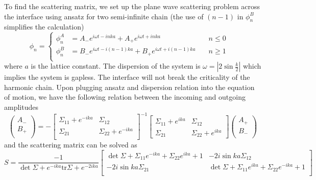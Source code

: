 To find the scattering matrix, we set up the plane wave scattering problem across the interface using ansatz for two semi-infinite chain (the use of $(n-1)$ in $\phi_n^B$ simplifies the calculation)
\begin{equation}
\label{eq:ansatz}
\phi_n
= \left\lbrace
  \begin{aligned}
    \phi_n^A &= A_{-} e^{i \omega t  - inka}  + A_{+} e^{i \omega t  + inka}  & \quad  n \le 0 \\
    \phi_n^B &= B_{-} e^{i \omega t  - i(n-1)ka}  + B_{+} e^{i \omega t  + i(n-1)ka} & \quad n \ge 1 \\
  \end{aligned} \right. 
 \quad 
\end{equation}
where $a$ is the lattice constant. The dispersion of the system is $\omega = \left|2\sin\frac{k}{2}\right|$ which implies the system is gapless. The interface will not break the criticality of the harmonic chain\cite{peschel_exact_2012}. Upon plugging ansatz and dispersion relation into the equation of motion, we have the following relation between the incoming and outgoing amplitudes
\begin{equation}
\label{eq:discrete_S}
\begin{pmatrix}
A_{-} \\
B_{+}\\
\end{pmatrix}
=-
\begin{bmatrix}
\Sigma_{11} + e^{-ika} & \Sigma_{12} \\
\Sigma_{21} & \Sigma_{22}  + e^{-ika}  \\
\end{bmatrix}^{-1}
\begin{bmatrix}
\Sigma_{11} +e^{ika} & \Sigma_{12}\\
\Sigma_{21} & \Sigma_{22} + e^{ika}
\end{bmatrix}
\begin{pmatrix}
A_{+}\\
B_{-}\\
\end{pmatrix}
\end{equation}
and the scattering matrix can be solved as
\begin{equation}
  S = \frac{-1}{ \det \Sigma  + e^{-ika} \text{tr} \Sigma   + e^{-2ika}}
\begin{bmatrix}
\det \Sigma+ \Sigma_{11} e^{-ika} + \Sigma_{22} e^{ika}+1  & -2i \sin ka \Sigma_{12}  \\
-2i \sin ka \Sigma_{21} &  \det \Sigma+ \Sigma_{11} e^{ika} + \Sigma_{22} e^{-ika}+1\\
\end{bmatrix}
\end{equation}
